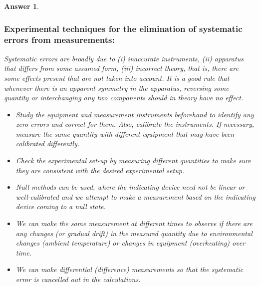\documentclass[a4paper]{article}
\newtheorem{ans}{Answer}[subsection]
\theoremstyle{new}
\begin{document}
\begin{ans}
\subsubsection*{Experimental techniques for the elimination of systematic errors from measurements:}
Systematic errors are broadly due to (i) inaccurate instruments, (ii) apparatus that differs from some assumed form, (iii) incorrect theory, that is, there are some effects present that are not taken into account. It is a good rule that whenever there is an apparent symmetry in the apparatus, reversing some quantity or interchanging any two components should in theory have no effect.
\begin{itemize}
    \item Study the equipment and measurement instruments beforehand to identify any zero errors and correct for them. Also, calibrate the instruments. If necessary, measure the same quantity with different equipment that may have been calibrated differently.
    \item Check the experimental set-up by measuring different quantities to make sure they are consistent with the desired experimental setup.
    \item Null methods can be used, where the indicating device need not be linear or well-calibrated and we attempt to make a measurement based on the indicating device coming to a null state.
    \item We can make the same measurement at different times to observe if there are any changes (or gradual drift) in the measured quantity due to environmental changes (ambient temperature) or changes in equipment (overheating) over time.
    \item We can make differential (difference) measurements so that the systematic error is cancelled out in the calculations.
\end{itemize}
\end{ans}
\newpage
\end{document}
